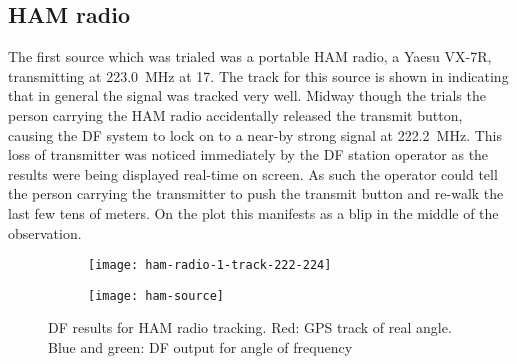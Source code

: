 \subsection{HAM radio}
The first source which was trialed was a portable HAM radio, a Yaesu VX-7R, transmitting at \SI{223.0}{\mega\hertz} at \SI{17}{\dBm}. The track for this source is shown in  indicating that in general the signal was tracked very well. Midway though the trials the person carrying the HAM radio accidentally released the transmit button, causing the DF system to lock on to a near-by strong signal at \SI{222.2}{\mega\hertz}. This loss of transmitter was noticed immediately by the DF station operator as the results were being displayed real-time on screen. As such the operator could tell the person carrying the transmitter to push the transmit button and re-walk the last few tens of meters. On the plot this manifests as a blip in the middle of the observation.

\begin{figure}
  \centering
  \begin{subfigure}[b]{0.77\textwidth}
    \centering
    \texttt{[image: ham-radio-1-track-222-224]}
  \end{subfigure}
  \begin{subfigure}[b]{0.22\textwidth}
    \centering
    \texttt{[image: ham-source]}
  \end{subfigure}
  \caption{DF results for HAM radio tracking. Red: GPS track of real angle. Blue and green: DF output for angle of frequency}
  \label{fig:field-trials:ham-source}
\end{figure}


